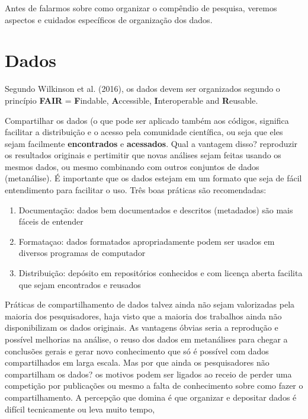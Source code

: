 \documentclass[]{book}
\providecommand{\tightlist}{%
  \setlength{\itemsep}{0pt}\setlength{\parskip}{0pt}}
\begin{document}
Antes de falarmos sobre como organizar o compêndio de pesquisa, veremos
aspectos e cuidados específicos de organização dos dados.

\hypertarget{dados}{%
\section{Dados}\label{dados}}

Segundo Wilkinson et al. (2016), os dados devem ser organizados segundo
o princípio \textbf{FAIR} = \textbf{F}indable, \textbf{A}ccessible,
\textbf{I}nteroperable and \textbf{R}eusable.

Compartilhar os dados (o que pode ser aplicado também aos códigos,
significa facilitar a distribuição e o acesso pela comunidade
científica, ou seja que eles sejam facilmente \textbf{encontrados} e
\textbf{acessados}. Qual a vantagem disso? reproduzir os resultados
originais e pertimitir que novas análises sejam feitas usando os mesmos
dados, ou mesmo combinando com outros conjuntos de dados (metanálise). É
importante que os dados estejam em um formato que seja de fácil
entendimento para facilitar o uso. Três boas práticas são recomendadas:

\begin{enumerate}
\def\labelenumi{\arabic{enumi}.}
\tightlist
\item
  Documentação: dados bem documentados e descritos (metadados) são mais
  fáceis de entender
\item
  Formataçao: dados formatados apropriadamente podem ser usados em
  diversos programas de computador
\item
  Distribuição: depósito em repositórios conhecidos e com licença aberta
  facilita que sejam encontrados e reusados
\end{enumerate}

Práticas de compartilhamento de dados talvez ainda não sejam valorizadas
pela maioria dos pesquisadores, haja visto que a maioria dos trabalhos
ainda não disponibilizam os dados originais. As vantagens óbvias seria a
reprodução e possível melhorias na análise, o reuso dos dados em
metanálises para chegar a conclusões gerais e gerar novo conhecimento
que só é possível com dados compartilhados em larga escala. Mas por que
ainda os pesquisadores não compartilham os dados? os motivos podem ser
ligados ao receio de perder uma competição por publicações ou mesmo a
falta de conhecimento sobre como fazer o compartilhamento. A percepção
que domina é que organizar e depositar dados é difícil tecnicamente ou
leva muito tempo,
\end{document}
